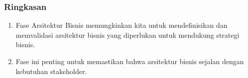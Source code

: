 \documentclass[aspectratio=169]{beamer}
\begin{document}
	\begin{frame}
		\frametitle{Ringkasan}
		\begin{enumerate}
			\item Fase Arsitektur Bisnis memungkinkan kita untuk mendefinisikan dan memvalidasi arsitektur bisnis yang diperlukan untuk mendukung strategi bisnis. 
			\item Fase ini penting untuk memastikan bahwa arsitektur bisnis sejalan dengan kebutuhan stakeholder.
		\end{enumerate}
	\end{frame}
	
\end{document}
